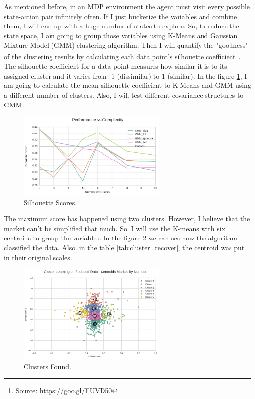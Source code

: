 \documentclass[a4paper]{article}
\begin{document}
As mentioned before, in an MDP environment the agent must visit every possible state-action pair infinitely often. If I just bucketize the variables and combine them, I will end up with a huge number of states to explore. So, to reduce the state space, I am going to group those variables using K-Means and Gaussian Mixture Model (GMM) clustering algorithm. Then I will quantify the "goodness" of the clustering results by calculating each data point's silhouette coefficient\footnote{Source: \url{https://goo.gl/FUVD50}}. The silhouette coefficient for a data point measures how similar it is to its assigned cluster and it varies from -1 (dissimilar) to 1 (similar). In the figure \ref{fig:scores}, I am going to calculate the mean silhouette coefficient to K-Means and GMM using a different number of clusters. Also, I will test different covariance structures to GMM.

\begin{figure}[ht]
\centering
\includegraphics[width=0.65\textwidth]{figures/cluster_scores.png}
\caption{\label{fig:scores}Silhouette Scores.}
\end{figure}

The maximum score has happened using two clusters. However, I believe that the market can't be simplified that much. So, I will use the K-means with six centroids to group the variables. In the figure \ref{fig:clusters} we can see how the algorithm classified the data. Also, in the table \ref{tab:cluster_recover}, the centroid was put in their original scales.

\begin{figure}[ht]
\centering
\includegraphics[width=0.65\textwidth]{figures/cluster_scatter.png}
\caption{\label{fig:clusters}Clusters Found.}
\end{figure}
\end{document}
